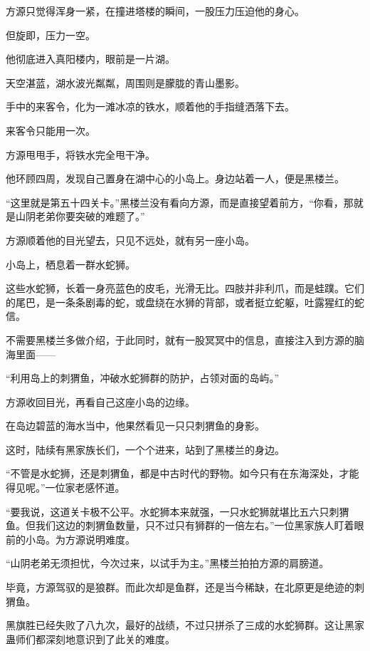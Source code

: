 
\begin{this_body}

方源只觉得浑身一紧，在撞进塔楼的瞬间，一股压力压迫他的身心。

但旋即，压力一空。

他彻底进入真阳楼内，眼前是一片湖。

天空湛蓝，湖水波光粼粼，周围则是朦胧的青山墨影。

手中的来客令，化为一滩冰凉的铁水，顺着他的手指缝洒落下去。

来客令只能用一次。

方源甩甩手，将铁水完全甩干净。

他环顾四周，发现自己置身在湖中心的小岛上。身边站着一人，便是黑楼兰。

“这里就是第五十四关卡。”黑楼兰没有看向方源，而是直接望着前方，“你看，那就是山阴老弟你要突破的难题了。”

方源顺着他的目光望去，只见不远处，就有另一座小岛。

小岛上，栖息着一群水蛇狮。

这些水蛇狮，长着一身亮蓝色的皮毛，光滑无比。四肢并非利爪，而是蛙蹼。它们的尾巴，是一条条剧毒的蛇，或盘绕在水狮的背部，或者挺立蛇躯，吐露猩红的蛇信。

不需要黑楼兰多做介绍，于此同时，就有一股冥冥中的信息，直接注入到方源的脑海里面——

“利用岛上的刺猬鱼，冲破水蛇狮群的防护，占领对面的岛屿。”

方源收回目光，再看自己这座小岛的边缘。

在岛边碧蓝的海水当中，他果然看见一只只刺猬鱼的身影。

这时，陆续有黑家族长们，一个个进来，站到了黑楼兰的身边。

“不管是水蛇狮，还是刺猬鱼，都是中古时代的野物。如今只有在东海深处，才能得见呢。”一位家老感怀道。

“要我说，这道关卡极不公平。水蛇狮本来就强，一只水蛇狮就堪比五六只刺猬鱼。但我们这边的刺猬鱼数量，只不过只有狮群的一倍左右。”一位黑家族人盯着眼前的小岛。为方源说明难度。

“山阴老弟无须担忧，今次过来，以试手为主。”黑楼兰拍拍方源的肩膀道。

毕竟，方源驾驭的是狼群。而此次却是鱼群，还是当今稀缺，在北原更是绝迹的刺猬鱼。

黑旗胜已经失败了八九次，最好的战绩，不过只拼杀了三成的水蛇狮群。这让黑家蛊师们都深刻地意识到了此关的难度。


\end{this_body}
